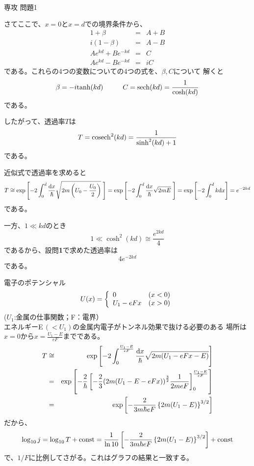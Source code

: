\documentclass[fleqn]{jbook}
\begin{document}
\begin{answer}{専攻 問題1}{}
\begin{subanswers}
\begin{subsubanswers}
    さてここで、$x=0$と$x=d$での境界条件から、
%
    \begin{eqnarray*}
      1+\beta &=&A+B \\
      i(1-\beta )&=&A-B \\
      Ae^{kd}+Be^{-kd}&=&C\\
      Ae^{kd}-Be^{-kd}&=&iC
    \end{eqnarray*}
%
    である。これらの4つの変数についての4つの式を、$\beta,C$について
    解くと
%
    \[ \beta = -i{\rm tanh} (kd) \hspace{10mm}%
       C = {\rm sech} (kd) = \frac{1}{{\rm cosh}(kd)}\]
%
    である。

    したがって、透過率$T$は
%
    \[ T={\rm cosech}^2(kd)=\frac{1}{\sinh ^2(kd)+1} \]
%
    である。

  \end{subsubanswers}

\SubAnswer
  \begin{subsubanswers}
  \SubSubAnswer
    近似式で透過率を求めると
%
    \[ T \cong \exp \left[ -2\int_0^d \frac{\d{x}}{\hbar}%
               \sqrt{2m\left( U_0-\frac{U_0}{2} \right)}\; \right]%
         = \exp \left[-2\int_0^d\frac{\d{x}}{\hbar}\sqrt{2m E}\; \right]%
         = \exp \left[ -2\int_0^d k \d{x} \right]%
         = e^{-2kd} \]
%
    である。

    一方、$1\ll kd$のとき
%
    \[ 1\ll \cosh ^2(kd)\cong \frac{e^{2kd}}{4} \]
%
    であるから、設問{\bf 1}で求めた透過率は
%
    \[4e^{-2kd}\]
%
    である。

  \SubSubAnswer
    電子のポテンシャル
%
    \[ U(x) = \left\{\begin{array}{lc}%
             \ds  0       & (x<0) \\
             \ds  U_1-eFx & (x>0) \end{array}\right. \]
%
    ($U_1$:金属の仕事関数；F：電界）\\
    エネルギーE\,$(<U_1)$の金属内電子がトンネル効果で抜ける必要のある
    場所は$x=0$から$x=\frac{U_1 - E}{eF}$までである。
%
    \begin{eqnarray*}
      T &\cong& \exp \left[-2\int_0^{\frac{U_1-E}{eF}}\frac{\d{x}}{\hbar}
               \sqrt{2m(U_1-eFx-E)} \right]\\
        &=& \exp \left[ -\frac{2}{\hbar}\left[-\frac{2}{3}%
                 {(2m(U_1-E-eFx))}^\frac{3}{2}\frac{1}{2meF}%
                 \right]_0^{\frac{U_1-E}{eF}} \right]\\
        &=& \exp \left[ -\frac{2}{3m\hbar eF}\left\{{2m(U_1-E)}%
                 \right\}^{3/2}\right]
    \end{eqnarray*}
%
    だから、
%
    \[ \log_{10}j=\log_{10}T+{\rm const}=\frac{1}{\ln 10}\left[%
      -\frac{2}{3m\hbar eF}\left\{ 2m(U_1-E) \right\}^{3/2}%
       \right] + {\rm const} \]
%
    で、$1/F$に比例してさがる。これはグラフの結果と一致する。

  \end{subsubanswers}
\end{subanswers}
\end{answer}
\end{document}

